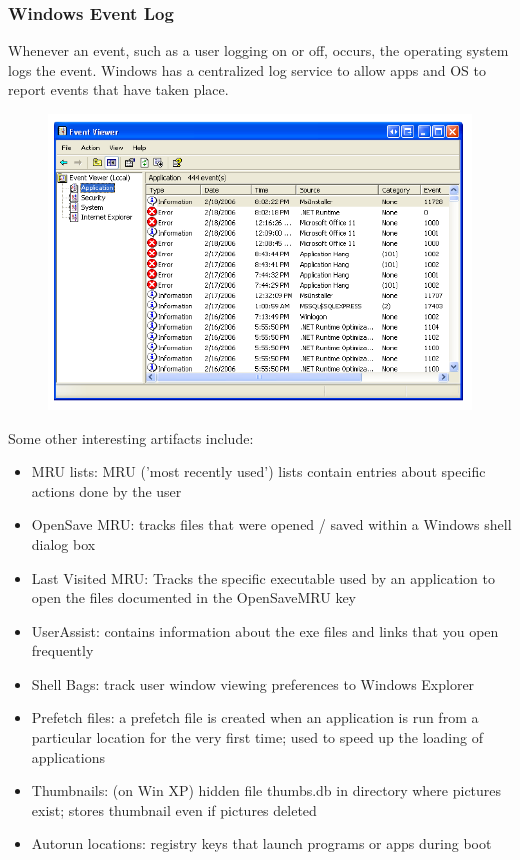 \documentclass[10pt,a4paper]{report}
\begin{document}
\subsubsection{Windows Event Log}
Whenever an event, such as a user logging on or off, occurs, the operating system logs the event. Windows has a centralized log service to allow apps and OS to report events that have taken place.
\begin{figure}[H]
\centering
\includegraphics[scale=0.4]{17.png}
\end{figure}
Some other interesting artifacts include:
\begin{itemize}
\item MRU lists: MRU ('most recently used') lists contain entries about specific actions done by the user
\item OpenSave MRU:  tracks files that were opened / saved within a Windows shell dialog box
\item Last Visited MRU: Tracks the specific executable used by an application to open the files documented in the OpenSaveMRU key
\item UserAssist: contains information about the exe files and links that you open frequently
\item Shell Bags: track user window viewing preferences to Windows Explorer
\item Prefetch files: a prefetch file is created when an application is run from a particular location for the very first time; used to speed up the loading of applications
\item Thumbnails: (on Win XP) hidden file thumbs.db in directory where pictures exist; stores thumbnail even if pictures deleted
\item Autorun locations: registry keys that launch programs or apps during boot
\end{itemize}
\end{document}
